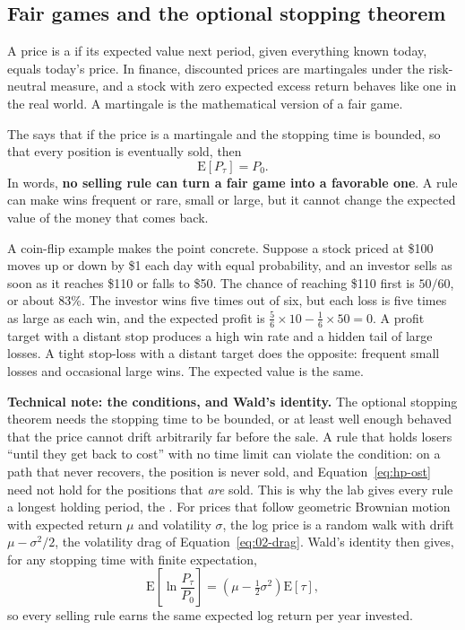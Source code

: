 \subsection{Fair games and the optional stopping theorem}

A price is a  if its expected value next period, given everything known today, equals today's price. In finance, discounted prices are martingales under the risk-neutral measure, and a stock with zero expected excess return behaves like one in the real world. A martingale is the mathematical version of a fair game.

The  says that if the price is a martingale and the stopping time is bounded, so that every position is eventually sold, then
\begin{equation}
  \mathrm{E}\left[P_\tau\right] = P_0 .
  \label{eq:hp-ost}
\end{equation}
In words, \textbf{no selling rule can turn a fair game into a favorable one}. A rule can make wins frequent or rare, small or large, but it cannot change the expected value of the money that comes back.

A coin-flip example makes the point concrete. Suppose a stock priced at \$100 moves up or down by \$1 each day with equal probability, and an investor sells as soon as it reaches \$110 or falls to \$50. The chance of reaching \$110 first is $50/60$, or about 83\%. The investor wins five times out of six, but each loss is five times as large as each win, and the expected profit is $\tfrac{5}{6}\times 10 - \tfrac{1}{6}\times 50 = 0$. A profit target with a distant stop produces a high win rate and a hidden tail of large losses. A tight stop-loss with a distant target does the opposite: frequent small losses and occasional large wins. The expected value is the same.

\begin{technote}
\textbf{Technical note: the conditions, and Wald's identity.} The optional stopping theorem needs the stopping time to be bounded, or at least well enough behaved that the price cannot drift arbitrarily far before the sale. A rule that holds losers ``until they get back to cost'' with no time limit can violate the condition: on a path that never recovers, the position is never sold, and Equation~\eqref{eq:hp-ost} need not hold for the positions that \emph{are} sold. This is why the lab gives every rule a longest holding period, the . For prices that follow geometric Brownian motion with expected return $\mu$ and volatility $\sigma$, the log price is a random walk with drift $\mu - \sigma^2/2$, the volatility drag of Equation~\eqref{eq:02-drag}. Wald's identity then gives, for any stopping time with finite expectation,
\begin{equation}
  \mathrm{E}\left[\ln \frac{P_\tau}{P_0}\right] = \left(\mu - \tfrac{1}{2}\sigma^2\right)\mathrm{E}[\tau] ,
  \label{eq:hp-wald}
\end{equation}
so every selling rule earns the same expected log return per year invested.
\end{technote}

